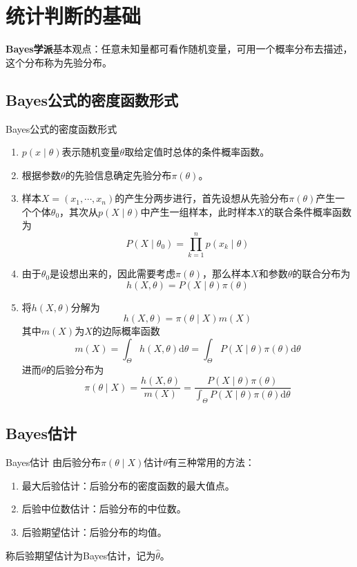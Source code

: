 \documentclass[lang = cn, scheme = chinese, thmcnt = section]{elegantbook}
\begin{document}
\section{统计判断的基础}

\textbf{Bayes学派}基本观点：任意未知量都可看作随机变量，可用一个概率分布去描述，这个分布称为先验分布。

\subsection{Bayes公式的密度函数形式}

\begin{theorem}{Bayes公式的密度函数形式}
	\begin{enumerate}
		\item $p(x\mid\theta)$表示随机变量$\theta$取给定值时总体的条件概率函数。
		\item 根据参数$\theta$的先验信息确定先验分布$\pi(\theta)$。
		\item 样本$X=(x_1,\cdots,x_n)$的产生分两步进行，首先设想从先验分布$\pi(\theta)$产生一个个体$\theta_0$，其次从$p(X\mid\theta)$中产生一组样本，此时样本$X$的联合条件概率函数为
		$$
		P(X\mid\theta_0)=\prod_{k=1}^{n}{p(x_k\mid\theta)}
		$$
		\item 由于$\theta_0$是设想出来的，因此需要考虑$\pi(\theta)$，那么样本$X$和参数$\theta$的联合分布为
		$$
		h(X,\theta)=P(X\mid\theta)\pi(\theta)
		$$
		\item 将$h(X,\theta)$分解为
		$$
		h(X,\theta)=\pi(\theta\mid X)m(X)
		$$
		其中$m(X)$为$X$的边际概率函数
		$$
		m(X)=\int_{\Theta}{h(X,\theta)\mathrm{d}\theta}=
		\int_{\Theta}{P(X\mid\theta)\pi(\theta)\mathrm{d}\theta}
		$$
		进而$\theta$的后验分布为
		$$
		\pi(\theta\mid X)=\frac{h(X,\theta)}{m(X)}=\frac{P(X\mid\theta)\pi(\theta)}{\int_{\Theta}{P(X\mid\theta)\pi(\theta)\mathrm{d}\theta}}
		$$
	\end{enumerate}
\end{theorem}

\subsection{Bayes估计}

\begin{definition}{Bayes估计}
	由后验分布$\pi(\theta\mid X)$估计$\theta$有三种常用的方法：
	\begin{enumerate}
		\item 最大后验估计：后验分布的密度函数的最大值点。
		\item 后验中位数估计：后验分布的中位数。
		\item 后验期望估计：后验分布的均值。
	\end{enumerate}
	称后验期望估计为Bayes估计，记为$\hat{\theta}$。
\end{definition}
\end{document}
